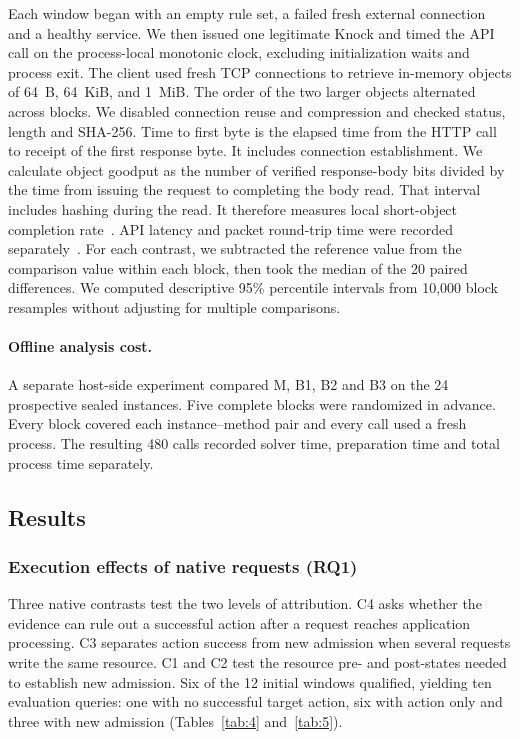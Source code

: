 Each window began with an empty rule set, a failed fresh external connection and a healthy service. We then issued one legitimate Knock and timed the API call on the process-local monotonic clock, excluding initialization waits and process exit. The client used fresh TCP connections to retrieve in-memory objects of 64~B, 64~KiB, and 1~MiB. The order of the two larger objects alternated across blocks. We disabled connection reuse and compression and checked status, length and SHA-256. Time to first byte is the elapsed time from the HTTP call to receipt of the first response byte. It includes connection establishment. We calculate object goodput as the number of verified response-body bits divided by the time from issuing the request to completing the body read. That interval includes hashing during the read. It therefore measures local short-object completion rate~\citep{r45}. API latency and packet round-trip time were recorded separately~\citep{r46}. For each contrast, we subtracted the reference value from the comparison value within each block, then took the median of the 20 paired differences. We computed descriptive 95\% percentile intervals from 10,000 block resamples without adjusting for multiple comparisons.

\paragraph{Offline analysis cost.}
A separate host-side experiment compared M, B1, B2 and B3 on the 24 prospective sealed instances. Five complete blocks were randomized in advance. Every block covered each instance--method pair and every call used a fresh process. The resulting 480 calls recorded solver time, preparation time and total process time separately.

\subsection{Results}\label{sec:results}
\subsubsection{Execution effects of native requests (RQ1)}\label{sec:rq1}

Three native contrasts test the two levels of attribution. C4 asks whether the evidence can rule out a successful action after a request reaches application processing. C3 separates action success from new admission when several requests write the same resource. C1 and C2 test the resource pre- and post-states needed to establish new admission. Six of the 12 initial windows qualified, yielding ten evaluation queries: one with no successful target action, six with action only and three with new admission (Tables~\ref{tab:4} and~\ref{tab:5}).

